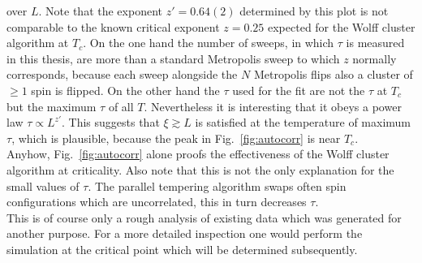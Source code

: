     over \(L\). Note that the exponent \(z'=0.64(2)\) determined by this plot is
    not comparable to the known critical exponent \(z=0.25\) \cite{NewmanBarkema1999}
    expected for the Wolff cluster algorithm at \(T_c\). On the one hand the number of sweeps,
    in which \(\tau\) is measured in this thesis, are more than a standard
    Metropolis sweep to which \(z\) normally corresponds, because each sweep
    alongside the \(N\) Metropolis flips also a cluster of \(\ge 1\) spin is
    flipped. On the other hand the \(\tau\) used for the fit are not the
    \(\tau\) at \(T_{c}\) but the maximum \(\tau\) of all \(T\).
    Nevertheless it is interesting that it obeys a power law
    \(\tau \propto L^{z'}\). This suggests that \(\xi \gtrsim L\)
    is satisfied at the temperature of maximum \(\tau\), which is plausible,
    because the peak in Fig.\ \ref{fig:autocorr}
    is near \(T_{c}\).\\
    Anyhow, Fig.\ \ref{fig:autocorr} alone
    proofs the effectiveness of the Wolff cluster algorithm at criticality.
    Also note that this is not the only explanation for the small values of \(\tau\).
    The parallel tempering algorithm swaps often spin configurations
    which are uncorrelated, this in turn decreases \(\tau\).\\
    This is of course only a rough analysis of existing data which was
    generated for another purpose. For a more detailed inspection one
    would perform the simulation at the critical point which will be
    determined subsequently.

